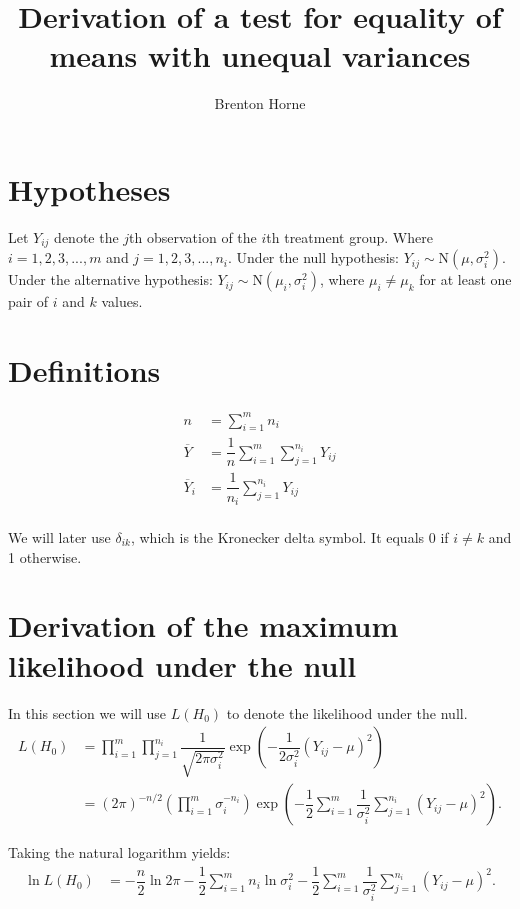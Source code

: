 \documentclass[12pt,a4paper]{article}
\title{Derivation of a test for equality of means with unequal variances}
\author{Brenton Horne}
\begin{document}
	\maketitle
	
	\tableofcontents
	
	\newpage
	
	\section{Hypotheses}
	Let $Y_{ij}$ denote the $j$th observation of the $i$th treatment group. Where $i=1, 2, 3, ..., m$ and $j=1, 2, 3, ..., n_i$. Under the null hypothesis: $Y_{ij} \sim \mathrm{N}(\mu, \sigma_i^2)$. Under the alternative hypothesis: $Y_{ij} \sim \mathrm{N}(\mu_i, \sigma_i^2)$, where $\mu_i \neq \mu_k$ for at least one pair of $i$ and $k$ values.
	
	\section{Definitions}
	\begin{align*}
	n &= \sum_{i=1}^m n_i \\
	\overline{Y} &= \dfrac{1}{n} \sum_{i=1}^m \sum_{j=1}^{n_i} Y_{ij} \\
	\overline{Y}_i &= \dfrac{1}{n_i} \sum_{j=1}^{n_i} Y_{ij} \\
	\end{align*}

	We will later use $\delta_{ik}$, which is the Kronecker delta symbol. It equals 0 if $i\neq k$ and 1 otherwise.
	
	\section{Derivation of the maximum likelihood under the null}
	In this section we will use $L(H_0)$ to denote the likelihood under the null.
	\begin{align}
		L(H_0) &= \prod_{i=1}^m \prod_{j=1}^{n_i} \dfrac{1}{\sqrt{2\pi \sigma^2_i}} \exp\left(-\dfrac{1}{2\sigma^2_i}(Y_{ij}-\mu)^2\right) \nonumber\\
		&= (2\pi)^{-n/2} \left(\prod_{i=1}^m \sigma_i^{-n_i}\right)\exp\left(-\dfrac{1}{2} \sum_{i=1}^m \dfrac{1}{\sigma_i^2}\sum_{j=1}^{n_i}(Y_{ij}-\mu)^2 \right). \label{LH0}
	\end{align}

	Taking the natural logarithm yields:
	\begin{align*}
		\ln{L(H_0)} &= -\dfrac{n}{2}\ln{2\pi} - \dfrac{1}{2}\sum_{i=1}^m n_i \ln{\sigma^2_i} - \dfrac{1}{2} \sum_{i=1}^m \dfrac{1}{\sigma^2_i}\sum_{j=1}^{n_i} (Y_{ij}-\mu)^2.
	\end{align*}
\end{document}

